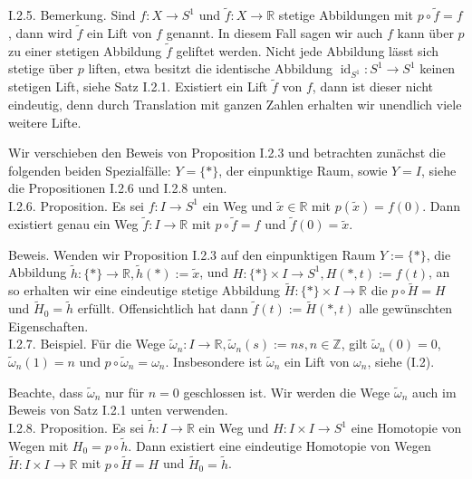 \documentclass[10pt, letterpaper]{article}
\begin{document}
I.2.5. Bemerkung. Sind $f: X \rightarrow S^{1}$ und $\tilde{f}: X \rightarrow \mathbb{R}$ stetige Abbildungen mit $p \circ \tilde{f}=f$, dann wird $\tilde{f}$ ein Lift von $f$ genannt. In diesem Fall sagen wir auch $f$ kann über $p$ zu einer stetigen Abbildung $\tilde{f}$ geliftet werden. Nicht jede Abbildung lässt sich stetige über $p$ liften, etwa besitzt die identische Abbildung $\operatorname{id}_{S^{1}}: S^{1} \rightarrow S^{1}$ keinen stetigen Lift, siehe Satz I.2.1. Existiert ein Lift $\tilde{f}$ von $f$, dann ist dieser nicht eindeutig, denn durch Translation mit ganzen Zahlen erhalten wir unendlich viele weitere Lifte.

Wir verschieben den Beweis von Proposition I.2.3 und betrachten zunächst die folgenden beiden Spezialfälle: $Y=\{*\}$, der einpunktige Raum, sowie $Y=I$, siehe die Propositionen I.2.6 und I.2.8 unten.\\
I.2.6. Proposition. Es sei $f: I \rightarrow S^{1}$ ein Weg und $\tilde{x} \in \mathbb{R}$ mit $p(\tilde{x})=f(0)$. Dann existiert genau ein Weg $\tilde{f}: I \rightarrow \mathbb{R}$ mit $p \circ \tilde{f}=f$ und $\tilde{f}(0)=\tilde{x}$.

Beweis. Wenden wir Proposition I.2.3 auf den einpunktigen Raum $Y:=\{*\}$, die Abbildung $\tilde{h}:\{*\} \rightarrow \mathbb{R}, \tilde{h}(*):=\tilde{x}$, und $H:\{*\} \times I \rightarrow S^{1}, H(*, t):=f(t)$, an so erhalten wir eine eindeutige stetige Abbildung $\tilde{H}:\{*\} \times I \rightarrow \mathbb{R}$ die $p \circ \tilde{H}=H$ und $\tilde{H}_{0}=\tilde{h}$ erfüllt. Offensichtlich hat dann $\tilde{f}(t):=\tilde{H}(*, t)$ alle gewünschten Eigenschaften.\\
I.2.7. Beispiel. Für die Wege $\tilde{\omega}_{n}: I \rightarrow \mathbb{R}, \tilde{\omega}_{n}(s):=n s, n \in \mathbb{Z}$, gilt $\tilde{\omega}_{n}(0)=0$, $\tilde{\omega}_{n}(1)=n$ und $p \circ \tilde{\omega}_{n}=\omega_{n}$. Insbesondere ist $\tilde{\omega}_{n}$ ein Lift von $\omega_{n}$, siehe (I.2).

Beachte, dass $\tilde{\omega}_{n}$ nur für $n=0$ geschlossen ist. Wir werden die Wege $\tilde{\omega}_{n}$ auch im Beweis von Satz I.2.1 unten verwenden.\\
I.2.8. Proposition. Es sei $\tilde{h}: I \rightarrow \mathbb{R}$ ein Weg und $H: I \times I \rightarrow S^{1}$ eine Homotopie von Wegen mit $H_{0}=p \circ \tilde{h}$. Dann existiert eine eindeutige Homotopie von Wegen $\tilde{H}: I \times I \rightarrow \mathbb{R}$ mit $p \circ \tilde{H}=H$ und $\tilde{H}_{0}=\tilde{h}$.
\end{document}
